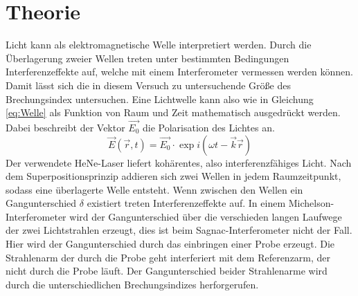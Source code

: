 \section{Theorie}
\label{sec:Theorie}
Licht kann als elektromagnetische Welle interpretiert werden. Durch die Überlagerung
zweier Wellen treten unter bestimmten Bedingungen Interferenzeffekte auf, welche mit
einem Interferometer vermessen werden können. Damit lässt sich die in diesem Versuch
zu untersuchende Größe des Brechungsindex untersuchen.
Eine Lichtwelle kann also wie in Gleichung \ref{eq:Welle} als Funktion von Raum und Zeit
mathematisch ausgedrückt werden. Dabei beschreibt der Vektor $\vec{E_0}$ die Polarisation des Lichtes an.
\begin{equation}
	\vec{E}(\vec{r},t) = \vec{E_0}\cdot \exp i(\omega t - \vec{k}\vec{r})
\label{eq:Welle}
\end{equation}
Der verwendete HeNe-Laser liefert kohärentes, also interferenzfähiges Licht.
Nach dem Superpositionsprinzip addieren sich zwei Wellen in jedem Raumzeitpunkt,
sodass eine überlagerte Welle entsteht. Wenn zwischen den Wellen ein Gangunterschied
$\delta$ existiert treten Interferenzeffekte auf. In einem Michelson-Interferometer wird der
Gangunterschied über die verschieden langen Laufwege der zwei Lichtstrahlen erzeugt, dies ist
beim Sagnac-Interferometer nicht der Fall. Hier wird der Gangunterschied durch das einbringen
einer Probe erzeugt. Die Strahlenarm der durch die Probe geht interferiert mit dem Referenzarm,
der nicht durch die Probe läuft. Der Gangunterschied beider Strahlenarme wird durch die
unterschiedlichen Brechungsindizes herforgerufen.
